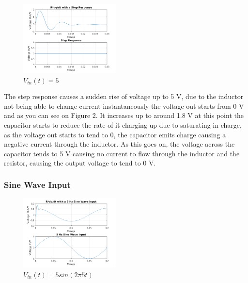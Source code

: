 \documentclass[11pt,a4paper]{article}
\begin{document}
\begin{figure}

	\vspace{-6mm}
  		\includegraphics[width=0.45\textwidth]{Ex3_Figs/Step.png}
	\vspace{-6mm}
  	\caption{$V_{in}(t)= 5$}
  	\label{fig:ex3g1}

\end{figure}

    \vspace{0mm}The step response causes a sudden rise of voltage up to 5 V, due to the inductor not being able to change current instantaneously the voltage out starts from 0 V and as you can see on Figure 2. It increases up to around 1.8 V at this point the capacitor starts to reduce the rate of it charging up due to saturating in charge, as the voltage out starts to tend to 0, the capacitor emits charge causing a negative current through the inductor. As this goes on, the voltage across the capacitor tends to 5 V causing no current to flow through the inductor and the resistor, causing the output voltage to tend to 0 V.

\subsubsection{Sine Wave Input}

\begin{figure}
    \vspace{-5mm}

  		\includegraphics[width=0.45\textwidth]{Ex3_Figs/5Sine2.png}
	\vspace{-6mm}
  	\caption{$V_{in}(t)= 5sin(2 \pi 5t)$}
  	\label{fig:ex3g2}

\end{figure}
\end{document}
